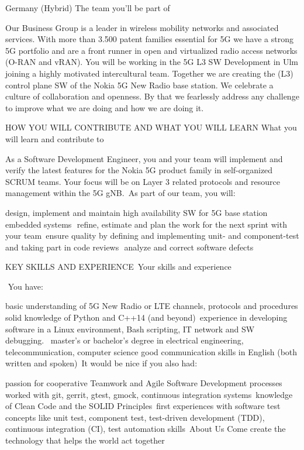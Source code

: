 Germany (Hybrid)
The team you'll be part of 

Our Business Group is a leader in wireless mobility networks and associated services. With 
more than 3.500 patent families essential for 5G we have a strong 5G portfolio and are a front 
runner in open and virtualized radio access networks (O-RAN and vRAN). 
You will be working in the 5G L3 SW Development in Ulm joining a highly motivated intercultural 
team. Together we are creating the (L3) control plane SW of the Nokia 5G New Radio base station. 
We celebrate a culture of collaboration and openness. By that we fearlessly address 
any challenge to improve what we are doing and how we are doing it.   


 

HOW YOU WILL CONTRIBUTE AND WHAT YOU WILL LEARN
What you will learn and contribute to 

As a Software Development Engineer, you and your team will implement and verify the latest 
features for the Nokia 5G product family in self-organized SCRUM teams.
Your focus will be on Layer 3 related protocols and resource management within the 5G gNB.  
As part of our team, you will: 

design, implement and maintain high availability SW for 5G base station embedded systems   
refine, estimate and plan the work for the next sprint with your team  
ensure quality by defining and implementing unit- and component-test and taking part in code reviews   
analyze and correct software defects

 
KEY SKILLS AND EXPERIENCE
 Your skills and experience 

  You have: 

basic understanding of 5G New Radio or LTE channels, protocols and procedures  
solid knowledge of Python and C++14 (and beyond)  
experience in developing software in a Linux environment, Bash scripting, IT network and SW debugging.    
master's or bachelor’s degree in electrical engineering, telecommunication, computer science
good communication skills in English (both written and spoken)
 It would be nice if you also had:  

passion for cooperative Teamwork and Agile Software Development processes  
worked with git, gerrit, gtest, gmock, continuous integration systems 
knowledge of Clean Code and the SOLID Principles  
first experiences with software test concepts like unit test, component test,
test-driven development (TDD), continuous integration (CI), test automation skills  
About Us
Come create the technology that helps the world act together

